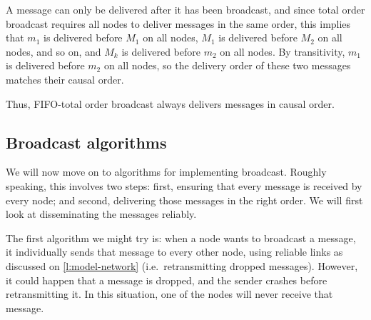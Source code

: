 {\begin{enumerate}
            A message can only be delivered after it has been broadcast, and since total order broadcast requires all nodes to deliver messages in the same order, this implies that $m_1$ is delivered before $M_1$ on all nodes, $M_1$ is delivered before $M_2$ on all nodes, and so on, and $M_k$ is delivered before $m_2$ on all nodes.
            By transitivity, $m_1$ is delivered before $m_2$ on all nodes, so the delivery order of these two messages matches their causal order.
    \end{enumerate}
    Thus, FIFO-total order broadcast always delivers messages in causal order.
}

\subsection{Broadcast algorithms}\label{sec:broadcast-protocols}

We will now move on to algorithms for implementing broadcast.
Roughly speaking, this involves two steps: first, ensuring that every message is received by every node; and second, delivering those messages in the right order.
We will first look at disseminating the messages reliably.

The first algorithm we might try is: when a node wants to broadcast a message, it individually sends that message to every other node, using reliable links as discussed on \autoref{l:model-network} (i.e.\ retransmitting dropped messages).
However, it could happen that a message is dropped, and the sender crashes before retransmitting it.
In this situation, one of the nodes will never receive that message.

